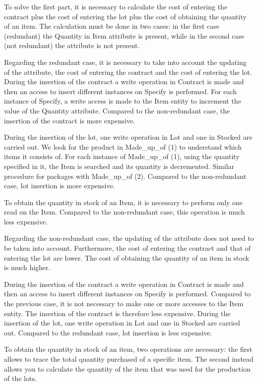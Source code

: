 To solve the first part, it is necessary to calculate the cost of entering the contract plus the cost of entering the lot plus the cost of obtaining the quantity of an item. The calculation must be done in two cases: in the first case (redundant) the Quantity in Item attribute is present, while in the second case (not redundant) the attribute is not present.

Regarding the redundant case, it is necessary to take into account the updating of the attribute, the cost of entering the contract and the cost of entering the lot.
During the insertion of the contract a write operation in Contract is made and then an access to insert different instances on Specify is performed. For each instance of Specify, a write access is made to the Item entity to increment the value of the Quantity attribute. Compared to the non-redundant case, the insertion of the contract is more expensive.

During the insertion of the lot, one write operation in Lot and one in Stocked are carried out. We look for the product in Made\_up\_of (1) to understand which items it consists of. For each instance of Made\_up\_of (1), using the quantity specified in it, the Item is searched and its quantity is decremented. Similar procedure for packages with Made\_up\_of (2). Compared to the non-redundant case, lot insertion is more expensive.

To obtain the quantity in stock of an Item, it is necessary to perform only one read on the Item. Compared to the non-redundant case, this operation is much less expensive.

Regarding the non-redundant case, the updating of the attribute does not need to be taken into account. Furthermore, the cost of entering the contract and that of entering the lot are lower. The cost of obtaining the quantity of an item in stock is much higher.

During the insertion of the contract a write operation in Contract is made and then an access to insert different instances on Specify is performed. Compared to the previous case, it is not necessary to make one or more accesses to the Item entity. The insertion of the contract is therefore less expensive.
During the insertion of the lot, one write operation in Lot and one in Stocked are carried out. Compared to the redundant case, lot insertion is less expensive.

To obtain the quantity in stock of an item, two operations are necessary: the first allows to trace the total quantity purchased of a specific item. The second instead allows you to calculate the quantity of the item that was used for the production of the lots.

